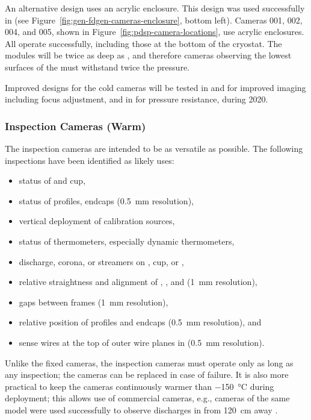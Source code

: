 An alternative design uses an acrylic enclosure.
This design was used successfully in  (see Figure~\ref{fig:gen-fdgen-cameras-enclosure}, bottom left). Cameras 001, 002, 004, and 005, shown in Figure~\ref{fig:pdsp-camera-locations}, use acrylic enclosures. 
All operate successfully, including those at the bottom of the cryostat. %
The  modules will be twice as deep as , and therefore cameras observing the lowest surfaces of the  must withstand twice the pressure.

Improved designs for the cold cameras will be tested in  and  for improved imaging including focus adjustment, and in  for pressure resistance, during 2020. 



\subsubsection{Inspection Cameras (Warm)}

The inspection cameras are intended to be as versatile as possible.
The following %
inspections have been identified as likely uses:
\begin{itemize}
\item status of  \fdth and cup,
\item status of  profiles, endcaps (\SI{0.5}{mm} resolution),
\item vertical deployment of calibration sources,
\item status of thermometers, especially dynamic thermometers,
\item {} discharge, corona, or streamers on  \fdth, cup, or ,
\item relative straightness and alignment of , , and  (\SI{1}{mm} resolution),
\item gaps between  frames (\SI{1}{mm} resolution),
\item relative position of profiles and endcaps (\SI{0.5}{mm} resolution), and 
\item sense wires at the top of outer wire planes in \single {} (\SI{0.5}{mm} resolution).
\end{itemize}

Unlike the fixed cameras, the inspection cameras must operate only as
long as any inspection; the cameras can be replaced in case of failure.  It
is also more practical to keep the cameras continuously warmer than
 \SI{-150}{\celsius} during deployment; this allows use of  %
commercial cameras, %
e.g., cameras of the same model were used successfully to observe discharges
in  from \SI{120}{cm} away \cite{Auger:2015xlo}.


